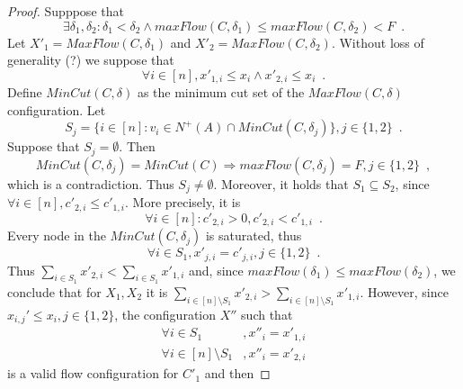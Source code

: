 \begin{proof}
  Supppose that
  \begin{equation*}
    \exists \delta_1, \delta_2 : \delta_1 < \delta_2 \wedge maxFlow\left(C, \delta_1\right) \leq maxFlow\left(C,
    \delta_2\right) < F \enspace.
  \end{equation*}
  Let $X'_1 = MaxFlow\left(C, \delta_1\right)$ and $X'_2 = MaxFlow\left(C, \delta_2\right)$. Without loss of generality (?)
  we suppose that
  \begin{equation*}
    \forall i \in [n], x'_{1, i} \leq x_i \wedge x'_{2, i} \leq x_i \enspace.
  \end{equation*}
  Define $MinCut\left(C, \delta\right)$ as the minimum cut set of the $MaxFlow\left(C, \delta\right)$ configuration. Let
  \begin{equation*}
    S_j = \{i \in [n] : v_i \in N^{+}\left(A\right) \cap MinCut\left(C, \delta_j\right)\}, j \in \{1, 2\} \enspace.
  \end{equation*}
  Suppose that $S_j = \emptyset$. Then
  \begin{equation*}
    MinCut\left(C, \delta_j\right) = MinCut\left(C\right) \Rightarrow maxFlow\left(C, \delta_j\right) = F, j \in \{1, 2\}
    \enspace,
  \end{equation*}
  which is a contradiction. Thus $S_j \neq \emptyset$.
  Moreover, it holds that $S_1 \subseteq S_2$, since $\forall i \in [n], c'_{2, i} \leq c'_{1, i}$. More precisely, it is
  \begin{equation*}
    \forall i \in [n] : c'_{2, i} > 0, c'_{2, i} < c'_{1, i} \enspace.
  \end{equation*}
  Every node in the $MinCut\left(C, \delta_j\right)$ is saturated, thus
  \begin{equation*}
    \forall i \in S_1, x'_{j, i} = c'_{j, i}, j \in \{1, 2\} \enspace.
  \end{equation*}
  Thus $\sum\limits_{i \in S_1} x'_{2, i} < \sum\limits_{i \in S_1}x'_{1, i}$ and, since $maxFlow(\delta_1) \leq
  maxFlow(\delta_2)$, we conclude that for $X_1, X_2$ it is $\sum\limits_{i \in [n] \setminus S_1}x'_{2, i} >
  \sum\limits_{i \in [n] \setminus S_1}x'_{1, i}$. However, since $x_{i,j}' \leq x_i, j \in \{1,2\}$, the configuration $X''$
  such that
  \begin{align*}
    \forall i \in S_1&, x''_i = x'_{1, i} \\
    \forall i \in [n] \setminus S_1&, x''_i = x'_{2, i}
  \end{align*}
  is a valid flow configuration for $C'_1$ and then

\end{proof}
